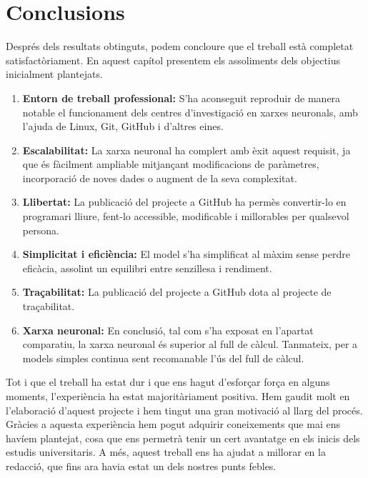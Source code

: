 \chapter{Conclusions}

\label{c:conclusions}

Després dels resultats obtinguts, podem concloure que el treball està completat satisfactòriament. En aquest capítol presentem els assoliments dels objectius inicialment plantejats.

\begin{enumerate}

     \item \textbf{Entorn de treball professional: } S’ha aconseguit reproduir de manera notable el funcionament dels centres d’investigació en xarxes neuronals, amb l'ajuda de Linux, Git, GitHub i d'altres eines.

     \item \textbf{Escalabilitat: } La xarxa neuronal ha complert amb èxit aquest requisit, ja que és fàcilment ampliable mitjançant modificacions de paràmetres, incorporació de noves dades o augment de la seva complexitat.

     \item \textbf{Llibertat: } La publicació del projecte a GitHub ha permès convertir-lo en programari lliure, fent-lo accessible, modificable i millorables per qualsevol persona.

     \item \textbf{Simplicitat i eficiència: } El model s’ha simplificat al màxim sense perdre eficàcia, assolint un equilibri entre senzillesa i rendiment.

     \item \textbf{Traçabilitat: } La publicació del projecte a GitHub dota al projecte de traçabilitat.

     \item \textbf{Xarxa neuronal: } En conclusió, tal com s’ha exposat en l’apartat comparatiu, la xarxa neuronal és superior al full de càlcul. Tanmateix, per a models simples continua sent recomanable l’ús del full de càlcul.

\end{enumerate}

Tot i que el treball ha estat dur i que ens hagut d'esforçar força en alguns moments, l’experiència ha estat majoritàriament positiva. Hem gaudit molt en l’elaboració d’aquest projecte i hem tingut una gran motivació al llarg del procés. Gràcies a aquesta experiència hem pogut adquirir coneixements que mai ens havíem plantejat, cosa que ens permetrà tenir un cert avantatge en els inicis dels estudis universitaris. A més, aquest treball ens ha ajudat a millorar en la redacció, que fins ara havia estat un dels nostres punts febles.

